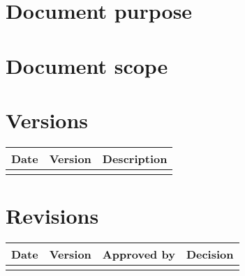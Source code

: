 \section{Document purpose} 



\section{Document scope}



\section{Versions}

\begin{tabular}{ | l | c | l | }
	\hline
	Date & Version & Description \\ \hline
	&  &  \\ \hline
\end{tabular}


\section{Revisions}

\begin{tabular}{ | l | c | c | l | }
	\hline
	Date & Version & Approved by & Decision \\ \hline
	& & & \\ \hline
\end{tabular}